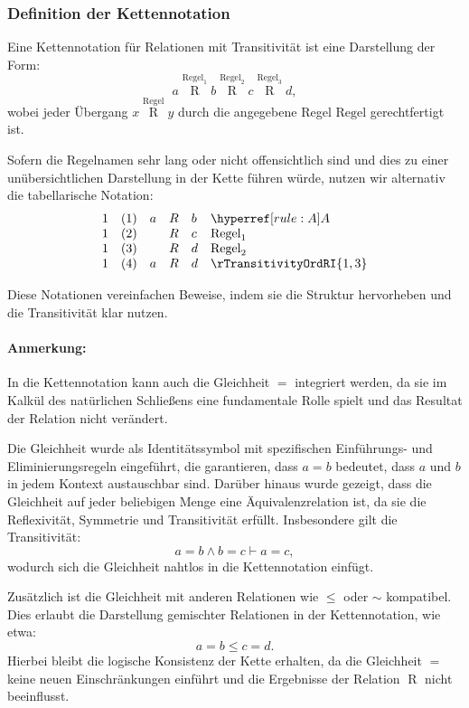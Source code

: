 \documentclass[main.tex]{subfiles}
\begin{document}
\subsubsection*{Definition der Kettennotation}

Eine Kettennotation für Relationen mit Transitivität ist eine Darstellung der Form:
\[
a \stackrel{\text{Regel}_1}{\mathrel{R}} b \stackrel{\text{Regel}_2}{\mathrel{R}} c \stackrel{\text{Regel}_3}{\mathrel{R}} d,
\]
wobei jeder Übergang \(x \stackrel{\text{Regel}}{\mathrel{R}} y\) durch die angegebene Regel \(\text{Regel}\) gerechtfertigt ist.

Sofern die Regelnamen sehr lang oder nicht offensichtlich sind und dies zu einer unübersichtlichen Darstellung in der Kette führen würde, nutzen wir alternativ die tabellarische Notation:
\[
\begin{array}{llclll}
	1 & (1) & a & \mathrel{R} & b & \rA \\
	1 & (2) &   & \mathrel{R} & c & \text{Regel}_1 \\
	1 & (3) &   & \mathrel{R} & d & \text{Regel}_2 \\
        1 & (4) &  a & \mathrel{R} & d & \rTransitivityOrdRI{1,3} \\
\end{array}
\]

Diese Notationen vereinfachen Beweise, indem sie die Struktur hervorheben und die Transitivität klar nutzen.

\paragraph{Anmerkung:}  
In die Kettennotation kann auch die Gleichheit \(=\) integriert werden, da sie im Kalkül des natürlichen Schließens eine fundamentale Rolle spielt und das Resultat der Relation nicht verändert. 

Die Gleichheit wurde als Identitätssymbol mit spezifischen Einführungs- und Eliminierungsregeln eingeführt, die garantieren, dass \(a = b\) bedeutet, dass \(a\) und \(b\) in jedem Kontext austauschbar sind. Darüber hinaus wurde gezeigt, dass die Gleichheit auf jeder beliebigen Menge eine Äquivalenzrelation ist, da sie die Reflexivität, Symmetrie und Transitivität erfüllt. Insbesondere gilt die Transitivität:
\[
a = b \land b = c \vdash a = c,
\]
wodurch sich die Gleichheit nahtlos in die Kettennotation einfügt.

Zusätzlich ist die Gleichheit mit anderen Relationen wie \(\leq\) oder \(\sim\) kompatibel. Dies erlaubt die Darstellung gemischter Relationen in der Kettennotation, wie etwa:
\[
a = b \leq c = d.
\]
Hierbei bleibt die logische Konsistenz der Kette erhalten, da die Gleichheit \(=\) keine neuen Einschränkungen einführt und die Ergebnisse der Relation \(\mathrel{R}\) nicht beeinflusst.
\end{document}
